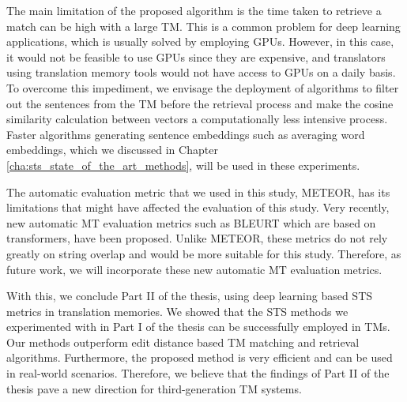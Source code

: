The main limitation of the proposed algorithm is the time taken to retrieve a match can be high with a large TM. This is a common problem for deep learning applications, which is usually solved by employing GPUs. However, in this case, it would not be feasible to use GPUs since they are expensive, and translators using translation memory tools would not have access to GPUs on a daily basis. To overcome this impediment, we envisage the deployment of algorithms to filter out the sentences from the TM before the retrieval process and make the cosine similarity calculation between vectors a computationally less intensive process. Faster algorithms generating sentence embeddings such as averaging word embeddings, which we discussed in Chapter \ref{cha:sts_state_of_the_art_methods}, will be used in these experiments. 

The automatic evaluation metric that we used in this study, METEOR, has its limitations that might have affected the evaluation of this study. Very recently, new automatic MT evaluation metrics such as BLEURT \autocite{sellam-etal-2020-bleurt} which are based on transformers, have been proposed. Unlike METEOR, these metrics do not rely greatly on string overlap and would be more suitable for this study. Therefore, as future work, we will incorporate these new automatic MT evaluation metrics.

With this, we conclude Part II of the thesis, using deep learning based STS metrics in translation memories. We showed that the STS methods we experimented with in Part I of the thesis can be successfully employed in TMs. Our methods outperform edit distance based TM matching and retrieval algorithms. Furthermore, the proposed method is very efficient and can be used in real-world scenarios. Therefore, we believe that the findings of Part II of the thesis pave a new direction for third-generation TM systems.

 


